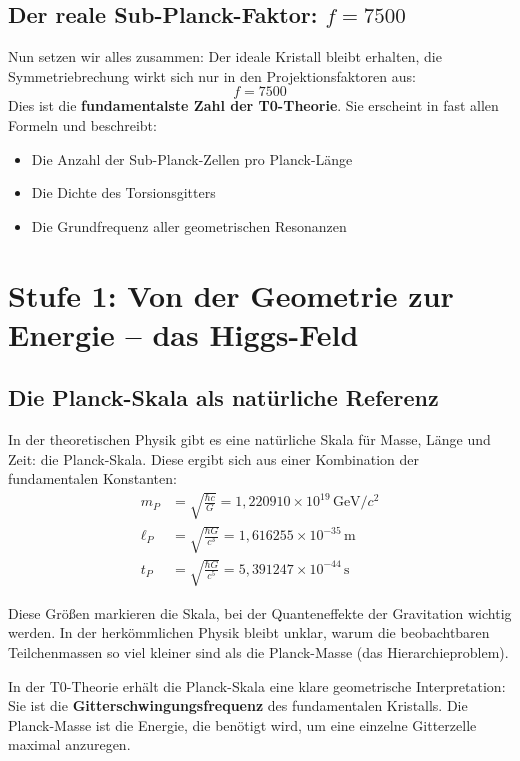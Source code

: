 	\subsection{Der reale Sub-Planck-Faktor: \(f = 7500\)}
	Nun setzen wir alles zusammen: Der ideale Kristall bleibt erhalten, die Symmetriebrechung wirkt sich nur in den Projektionsfaktoren aus:
	\begin{equation}
		\boxed{f = 7500}
	\end{equation}
	Dies ist die \textbf{fundamentalste Zahl der T0-Theorie}. Sie erscheint in fast allen Formeln und beschreibt:
	\begin{itemize}
		\item Die Anzahl der Sub-Planck-Zellen pro Planck-Länge
		\item Die Dichte des Torsionsgitters
		\item Die Grundfrequenz aller geometrischen Resonanzen
	\end{itemize}
	\section{Stufe 1: Von der Geometrie zur Energie -- das Higgs-Feld}
	
	\subsection{Die Planck-Skala als natürliche Referenz}
	
	In der theoretischen Physik gibt es eine natürliche Skala für Masse, Länge und Zeit: die Planck-Skala. Diese ergibt sich aus einer Kombination der fundamentalen Konstanten:
	\begin{align}
		m_P &= \sqrt{\frac{\hbar c}{G}} = 1{,}220910 \times 10^{19}\,\text{GeV}/c^2 \\
		\ell_P &= \sqrt{\frac{\hbar G}{c^3}} = 1{,}616255 \times 10^{-35}\,\text{m} \\
		t_P &= \sqrt{\frac{\hbar G}{c^5}} = 5{,}391247 \times 10^{-44}\,\text{s}
	\end{align}
	
	Diese Größen markieren die Skala, bei der Quanteneffekte der Gravitation wichtig werden. In der herkömmlichen Physik bleibt unklar, warum die beobachtbaren Teilchenmassen so viel kleiner sind als die Planck-Masse (das Hierarchieproblem).
	
	In der T0-Theorie erhält die Planck-Skala eine klare geometrische Interpretation: Sie ist die \textbf{Gitterschwingungsfrequenz} des fundamentalen Kristalls. Die Planck-Masse ist die Energie, die benötigt wird, um eine einzelne Gitterzelle maximal anzuregen.
	
